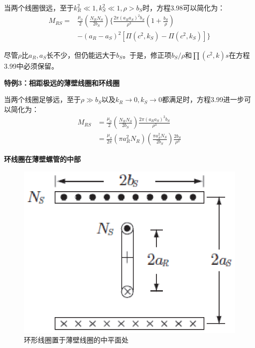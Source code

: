   当两个线圈很远，至于$k_R^2 \ll 1, k_S^2\ll 1,\rho > b_S$时，方程3.98可以简化为：
  \begin{equation}
  \begin{split}
M_{RS}=&\frac{\mu_0}{2}(\frac{N_RN_S}{2b_S})\{\frac{2\pi(a_Ra_S)^2b_S}{\rho^3}(1+\frac{b_S}{\rho})\\
&-(a_R-a_S)^2[\Pi(c^2,k_S)-\Pi(c^2,k_S)]\}%
  \end{split}
  \end{equation}
  
尽管$\rho$比$a_R,a_S$长不少，但仍能远大于$b_S$。于是，修正项$b_S/\rho$和$\prod(c^2, k)s$在方程3.99中必须保留。

\textbf{特例3：相距极远的薄壁线圈和环线圈} 

  当两个线圈足够远，至于$\rho \gg b_S$以及$k_R\rightarrow 0,k_S\rightarrow 0$都满足时，方程3.99进一步可以简化为：
 \begin{equation}
\begin{split}
M_{RS}&=\frac{\mu_0}{2}(\frac{N_RN_S}{2b_S})\frac{2\pi(a_Ra_S)^2b_S}{\rho^3}\\
&=\frac{\mu_o}{2\pi}(\pi a_R^2N_R)(\frac{\pi a_S^2N_S}{2b_S})\frac{2b_S}{\rho^3}%
\end{split}
\end{equation}

\textbf{环线圈在薄壁螺管的中部} 
\begin{figure}[htbp]
	\centering
	\includegraphics[scale=0.7]{chpt3/figs/fig3.15.eps}
	\caption{环形线圈置于薄壁线圈的中平面处}
\end{figure}

